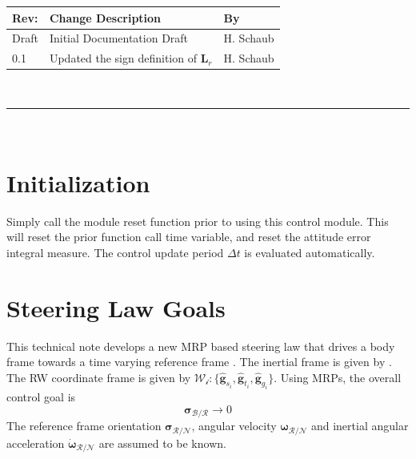 \documentclass[]{BasiliskReportMemo}
\begin{document}
\makeCover


%
%
\pagestyle{empty}
{\renewcommand{\arraystretch}{2}
\noindent
\begin{longtable}{|p{0.5in}|p{4.5in}|p{1.14in}|}
\hline
{\bfseries Rev}: & {\bfseries Change Description} & {\bfseries By} \\
\hline
Draft & Initial Documentation Draft & H. Schaub \\
0.1 & Updated the sign definition of $\bm L_{r}$ & H. Schaub \\
\hline

\end{longtable}
}

\newpage
\setcounter{page}{1}
\pagestyle{fancy}

\tableofcontents
~\\ \hrule ~\\



\section{Initialization}
Simply call the module reset function prior to using this control module.  This will reset the prior function call time variable, and reset the attitude error integral measure.  The control update period $\Delta t$ is evaluated automatically.  


\section{Steering Law Goals}
This technical note develops a new MRP based steering law that drives a body frame  towards a time varying reference frame . The inertial frame is given by .   The RW coordinate frame is given by $\mathcal{W_{i}}:\{ \hat{\bm g}_{s_{i}}, \hat{\bm g}_{t_{i}}, \hat{\bm g}_{g_{i}} \}$.  Using MRPs, the overall control goal is 
\begin{equation}
	\label{eq:MS:1}
	\bm\sigma_{\mathcal{B}/\mathcal{R}} \rightarrow 0
\end{equation}
The reference frame orientation $\bm \sigma_{\mathcal{R}/\mathcal{N}}$, angular velocity $\bm\omega_{\mathcal{R}/\mathcal{N}}$ and inertial angular acceleration $\dot{\bm \omega}_{\mathcal{R}/\mathcal{N}}$ are assumed to be known. 
\end{document}
